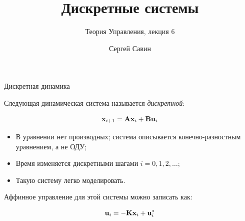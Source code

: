 \documentclass{beamer}
\title{Дискретные системы}
\subtitle{Теория Управления, лекция 6}
\author{Сергей Савин}
\date{\mydate}
\begin{document}
\maketitle


%
%




\begin{frame}{Дискретная динамика}
	\begin{flushleft}
		
		Следующая динамическая система называется \emph{дискретной}:
		
		\begin{equation}
			\mathbf{x}_{i+1} = \mathbf{A}\mathbf{x}_i + \mathbf{B}\mathbf{u}_i
		\end{equation}
		
		\begin{itemize}
			\item В уравнении нет производных; система описывается конечно-разностным уравнением, а не ОДУ;
			\item Время изменяется дискретными шагами $i = 0,1,2,\dots$;
			\item Такую систему легко моделировать.
		\end{itemize}
		
		\bigskip
		
		Аффинное управление для этой системы можно записать как:
		
		\begin{equation}
			\mathbf{u}_i = -\mathbf{K}\mathbf{x}_i + \mathbf{u}_i^*
		\end{equation}
		
	\end{flushleft}
\end{frame}
\end{document}
